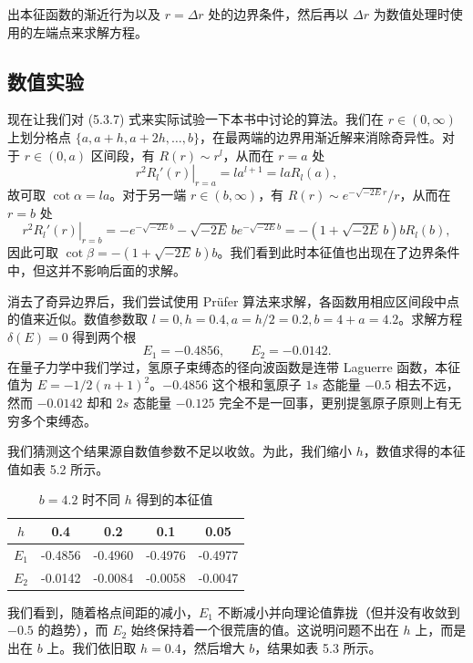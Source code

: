 出本征函数的渐近行为以及 $r=\Delta r$ 处的边界条件，然后再以 $\Delta r$ 为数值处理时使用的左端点来求解方程。

\subsection{数值实验}

现在让我们对 (5.3.7) 式来实际试验一下本书中讨论的算法。我们在 $r\in(0,\infty)$ 上划分格点 $\{a,a+h,a+2h,\ldots,b\}$，在最两端的边界用渐近解来消除奇异性。对于 $r\in(0,a)$ 区间段，有 $R(r)\sim r^l$，从而在 $r=a$ 处
\begin{equation}
\left.r^2R_l'(r)\right|_{r=a}=la^{l+1}=laR_l(a),
\tag{5.3.32}
\end{equation}
故可取 $\cot\alpha=la$。对于另一端 $r\in(b,\infty)$，有 $R(r)\sim e^{-\sqrt{-2E}r}/r$，从而在 $r=b$ 处
\begin{equation}
\left.r^2R_l'(r)\right|_{r=b}
=-e^{-\sqrt{-2E}b}-\sqrt{-2E}\,b e^{-\sqrt{-2E}b}
=-(1+\sqrt{-2E}\,b)bR_l(b),
\tag{5.3.33}
\end{equation}
因此可取 $\cot\beta=-(1+\sqrt{-2E}\,b)b$。我们看到此时本征值也出现在了边界条件中，但这并不影响后面的求解。

消去了奇异边界后，我们尝试使用 Prüfer 算法来求解，各函数用相应区间段中点的值来近似。数值参数取 $l=0,h=0.4,a=h/2=0.2,b=4+a=4.2$。求解方程 $\delta(E)=0$ 得到两个根
\begin{equation}
E_1=-0.4856,\qquad E_2=-0.0142.
\tag{5.3.34}
\end{equation}
在量子力学中我们学过，氢原子束缚态的径向波函数是连带 Laguerre 函数，本征值为 $E=-1/2(n+1)^2$。$-0.4856$ 这个根和氢原子 $1s$ 态能量 $-0.5$ 相去不远，然而 $-0.0142$ 却和 $2s$ 态能量 $-0.125$ 完全不是一回事，更别提氢原子原则上有无穷多个束缚态。

我们猜测这个结果源自数值参数不足以收敛。为此，我们缩小 $h$，数值求得的本征值如表 5.2 所示。

\begin{table}[htbp]
\centering
\caption{$b=4.2$ 时不同 $h$ 得到的本征值}
\begin{tabular}{@{}ccccc@{}}
\toprule
$h$&0.4&0.2&0.1&0.05\\
\midrule
$E_1$&-0.4856&-0.4960&-0.4976&-0.4977\\
$E_2$&-0.0142&-0.0084&-0.0058&-0.0047\\
\bottomrule
\end{tabular}
\end{table}
我们看到，随着格点间距的减小，$E_1$ 不断减小并向理论值靠拢（但并没有收敛到 $-0.5$ 的趋势），而 $E_2$ 始终保持着一个很荒唐的值。这说明问题不出在 $h$ 上，而是出在 $b$ 上。我们依旧取 $h=0.4$，然后增大 $b$，结果如表 5.3 所示。

